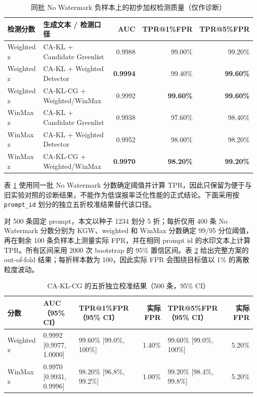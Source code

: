 \documentclass[a4paper,UTF8,zihao=5]{ctexart}
\newcommand{\method}{CA-KL}
\newcommand{\fullmethod}{CA-KL-CG}
\begin{document}
\begin{table}[H]
    \centering
    \caption{同批 No Watermark 负样本上的初步加权检测质量（仅作诊断）}
    \label{tab:auc}
    \scriptsize
    \setlength{\tabcolsep}{2.5pt}
    \begin{tabularx}{\textwidth}{p{}p{}rrr}
        \toprule
        检测分数       & 生成文本 / 检测口径                     & AUC             & TPR@1\%FPR       & TPR@5\%FPR       \\
        \midrule
        Weighted z & CA-KL + Candidate Greenlist     & 0.9988          & 99.00\%          & 99.20\%          \\
        Weighted z & \method{} + Weighted Detector   & \textbf{0.9994} & 99.40\%          & \textbf{99.60\%} \\
        Weighted z & \fullmethod{} + Weighted/WinMax & 0.9992          & \textbf{99.60\%} & \textbf{99.60\%} \\
        WinMax z   & CA-KL + Candidate Greenlist     & 0.9938          & 97.60\%          & 98.40\%          \\
        WinMax z   & \method{} + Weighted Detector   & 0.9952          & 98.00\%          & 98.20\%          \\
        WinMax z   & \fullmethod{} + Weighted/WinMax & \textbf{0.9970} & \textbf{98.20\%} & \textbf{99.20\%} \\
        \bottomrule
    \end{tabularx}
\end{table}

表 \ref{tab:auc} 使用同一批 No Watermark 分数确定阈值并计算 TPR，因此只保留为便于与旧实验对照的诊断结果，不能作为低误报率泛化性能的正式结论。下面采用按 \texttt{prompt\_id} 划分的独立五折校准结果替代该口径。

对 500 条固定 prompt，本文以种子 1234 划分 5 折；每折仅用 400 条 No Watermark 分数分别为 KGW、weighted 和 WinMax 分数确定 99/95 分位阈值，再在剩余 100 条负样本上测量实际 FPR，并在相同 prompt id 的水印文本上计算 TPR。所有区间采用 2000 次 bootstrap 的 95\% 置信区间。表 \ref{tab:calibrated-final} 给出完整方案的 out-of-fold 结果；每折样本数为 100，因此实际 FPR 会围绕目标值以 1\% 的离散粒度波动。

\begin{table}[H]
    \centering
    \caption{\fullmethod{} 的五折独立校准结果（500 条，95\% CI）}
    \label{tab:calibrated-final}
    \scriptsize
    \setlength{\tabcolsep}{3pt}
    \begin{tabularx}{\textwidth}{p{}p{}p{}rp{}r}
        \toprule
        分数         & AUC（95\% CI）            & TPR@1\%FPR（95\% CI）      & 实际 FPR & TPR@5\%FPR（95\% CI）      & 实际 FPR \\
        \midrule
        Weighted z & 0.9992 [0.9977, 1.0000] & 99.60\% [99.0\%, 100\%]  & 1.40\% & 99.60\% [99.0\%, 100\%]  & 5.20\% \\
        WinMax z   & 0.9970 [0.9931, 0.9996] & 98.20\% [96.8\%, 99.2\%] & 1.00\% & 99.20\% [98.4\%, 99.8\%] & 5.20\% \\
        \bottomrule
    \end{tabularx}
\end{table}
\end{document}
